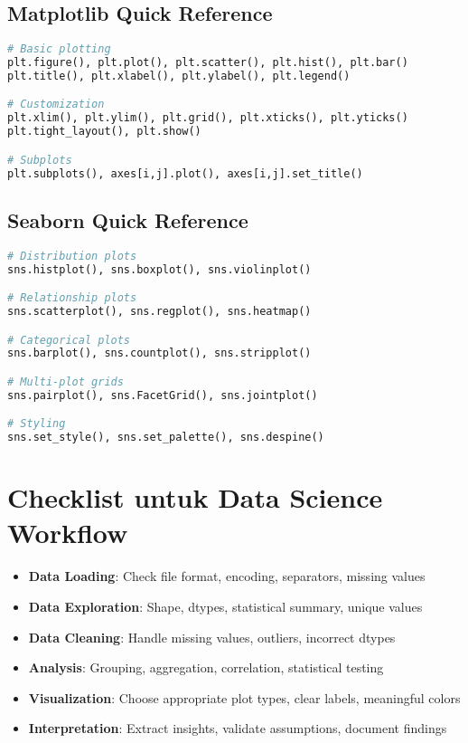 \subsection*{Matplotlib Quick Reference}
\begin{lstlisting}[language=python, style=python]
# Basic plotting
plt.figure(), plt.plot(), plt.scatter(), plt.hist(), plt.bar()
plt.title(), plt.xlabel(), plt.ylabel(), plt.legend()

# Customization
plt.xlim(), plt.ylim(), plt.grid(), plt.xticks(), plt.yticks()
plt.tight_layout(), plt.show()

# Subplots
plt.subplots(), axes[i,j].plot(), axes[i,j].set_title()
\end{lstlisting}

\subsection*{Seaborn Quick Reference}
\begin{lstlisting}[language=python, style=python]
# Distribution plots
sns.histplot(), sns.boxplot(), sns.violinplot()

# Relationship plots
sns.scatterplot(), sns.regplot(), sns.heatmap()

# Categorical plots
sns.barplot(), sns.countplot(), sns.stripplot()

# Multi-plot grids
sns.pairplot(), sns.FacetGrid(), sns.jointplot()

# Styling
sns.set_style(), sns.set_palette(), sns.despine()
\end{lstlisting}

\section*{Checklist untuk Data Science Workflow}

\begin{itemize}
  \item \textbf{Data Loading}: Check file format, encoding, separators, missing values
  \item \textbf{Data Exploration}: Shape, dtypes, statistical summary, unique values
  \item \textbf{Data Cleaning}: Handle missing values, outliers, incorrect dtypes
  \item \textbf{Analysis}: Grouping, aggregation, correlation, statistical testing
  \item \textbf{Visualization}: Choose appropriate plot types, clear labels, meaningful colors
  \item \textbf{Interpretation}: Extract insights, validate assumptions, document findings
\end{itemize}

